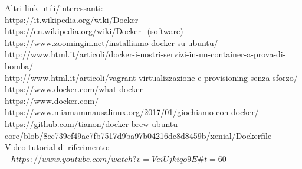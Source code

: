 \documentclass[a4paper,12pt,openright,twoside]{report}
\begin{document}
Altri link utili/interessanti:\\
https://it.wikipedia.org/wiki/Docker\\
https://en.wikipedia.org/wiki/Docker\_(software)\\
https://www.zoomingin.net/installiamo-docker-su-ubuntu/\\
http://www.html.it/articoli/docker-i-nostri-servizi-in-un-container-a-prova-di-bomba/\\
http://www.html.it/articoli/vagrant-virtualizzazione-e-provisioning-senza-sforzo/\\
https://www.docker.com/what-docker\\
https://www.docker.com/\\
https://www.miamammausalinux.org/2017/01/giochiamo-con-docker/\\
https://github.com/tianon/docker-brew-ubuntu-core/blob/8ec739cf49ac7fb7517d9ba97b04216dc8d8459b/xenial/Dockerfile\\

\Large
Video tutorial di riferimento:
\normalsize\\
\href{https://www.youtube.com/watch?v=VeiUjkiqo9E#t=60}{$- https://www.youtube.com/watch?v=VeiUjkiqo9E\#t=60$}\\
\end{document}
